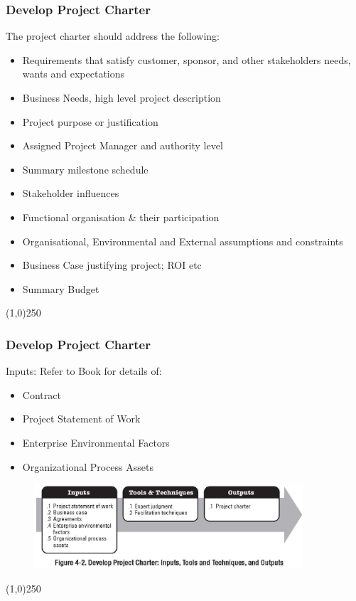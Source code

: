 \begin{frame}
\frametitle{Develop Project Charter}
The project charter should address the following:
\begin{itemize}
	\item Requirements that satisfy customer, sponsor, and other stakeholders needs, wants and expectations
	\item Business Needs, high level project description
	\item Project purpose or justification
	\item Assigned Project Manager and authority level
	\item Summary milestone schedule
	\item Stakeholder influences
	\item Functional organisation \& their participation
	\item Organisational, Environmental and External assumptions and constraints
	\item Business Case justifying project; ROI etc
	\item Summary Budget
\end{itemize}
\end{frame}\begin{center}\line(1,0){250}\end{center}
%
%


\begin{frame}
\frametitle{Develop Project Charter} 
Inputs: Refer to Book for details of:
\begin{itemize}
	\item Contract
	\item Project Statement of Work
	\item Enterprise Environmental Factors
	\item Organizational Process Assets
\end{itemize}
\begin{figure}
	\centering
 		\includegraphics[width = 10cm]{images/Fig4-2.jpg}
 	\label{fig:4-2}
 \end{figure}
\end{frame}\begin{center}\line(1,0){250}\end{center}
%
%

